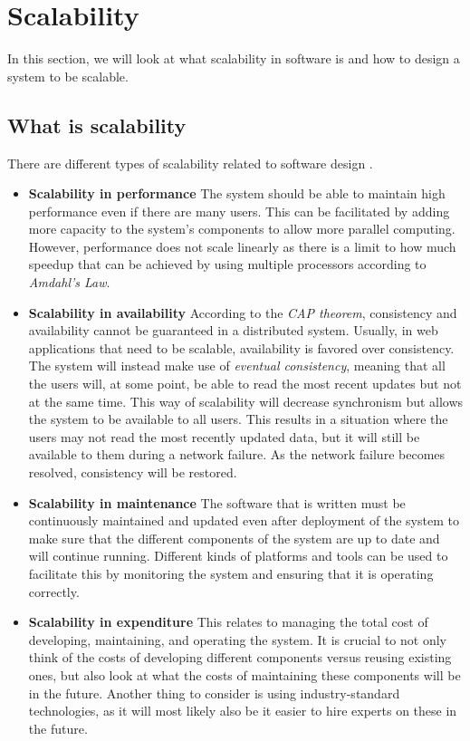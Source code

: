 \section{Scalability}\label{sec:scalability}
In this section, we will look at what scalability in software is and how to design a system to be scalable. 

\subsection{What is scalability}
There are different types of scalability related to software design \cite{ScalabilityDesignPrinciples}.
\begin{itemize}
    \item \textbf{Scalability in performance} The system should be able to maintain high performance even if there are many users. This can be facilitated by adding more capacity to the system's components to allow more parallel computing. 
    However, performance does not scale linearly as there is a limit to how much speedup that can be achieved by using multiple processors according to \textit{Amdahl's Law}. 
    \item \textbf{Scalability in availability} According to the \textit{CAP theorem}, consistency and availability cannot be guaranteed in a distributed system. 
    Usually, in web applications that need to be scalable, availability is favored over consistency. 
    The system will instead make use of \textit{eventual consistency}, meaning that all the users will, at some point, be able to read the most recent updates but not at the same time. 
    This way of scalability will decrease synchronism but allows the system to be available to all users.
    This results in a situation where the users may not read the most recently updated data, but it will still be available to them during a network failure.
    As the network failure becomes resolved, consistency will be restored.
    \item \textbf{Scalability in maintenance} The software that is written must be continuously maintained and updated even after deployment of the system to make sure that the different components of the system are up to date and will continue running. 
    Different kinds of platforms and tools can be used to facilitate this by monitoring the system and ensuring that it is operating correctly. 
    \item \textbf{Scalability in expenditure} This relates to managing the total cost of developing, maintaining, and operating the system. 
    It is crucial to not only think of the costs of developing different components versus reusing existing ones, but also look at what the costs of maintaining these components will be in the future. 
    Another thing to consider is using industry-standard technologies, as it will most likely also be it easier to hire experts on these in the future.
\end{itemize}

